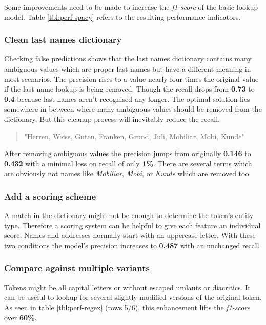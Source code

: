 Some improvements need to be made to increase the \emph{f1-score} of the basic lookup model. Table \ref{tbl:perf-spacy} refers to the resulting performance indicators.

\subsubsection{Clean last names dictionary}

Checking false predictions shows that the last names dictionary contains many ambiguous values which are proper last names but have a different meaning in most scenarios. The precision rises to a value nearly four times the original value if the last name lookup is being removed. Though the recall drops from \textbf{0.73} to \textbf{0.4} because last names aren't recognised any longer. The optimal solution lies somewhere in between where many ambiguous values should be removed from the dictionary. But this cleanup process will inevitably reduce the recall.

\begin{quote}
    "Herren, Weiss, Guten, Franken, Grund, Juli, Mobiliar, Mobi, Kunde"
\end{quote}

After removing ambiguous values the precision jumps from originally \textbf{0.146} to \textbf{0.432} with a minimal loss on recall of only \textbf{1\%}. There are several terms which are obviously not names like \emph{Mobiliar}, \emph{Mobi}, or \emph{Kunde} which are removed too.

\subsubsection{Add a scoring scheme}

A match in the dictionary might not be enough to determine the token's entity type. Therefore a scoring system can be helpful to give each feature an individual score. Names and addresses normally start with an uppercase letter. With these two conditions the model's precision increases to \textbf{0.487} with an unchanged recall. 

\subsubsection{Compare against multiple variants}

Tokens might be all capital letters or without escaped umlauts or \gls{diacritic}s. It can be useful to lookup for several slightly modified versions of the original token. As seen in table \ref{tbl:perf-regex} (rows 5/6), this enhancement lifts the \emph{f1-score} over \textbf{60\%}.

